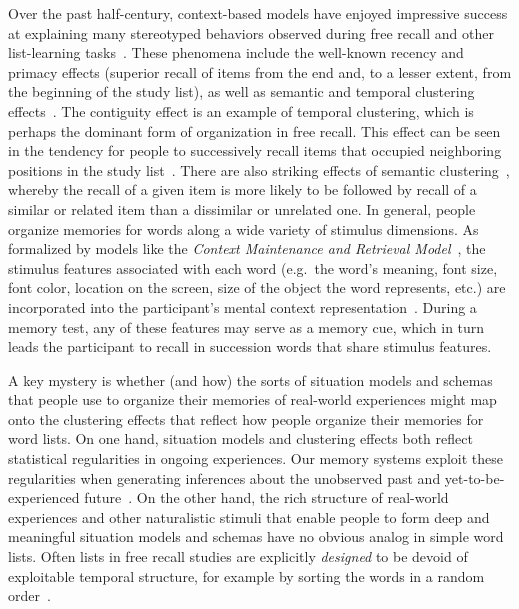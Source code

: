 \documentclass[11pt]{article}
\begin{document}
Over the past half-century, context-based models have enjoyed impressive
success at explaining many stereotyped behaviors observed during free recall
and other list-learning tasks~\citep{Este55a, RaaiShif80, GlenEtal83,
HowaKaha02a, SiroEtal05, KimbEtal07, PolyKaha08, SedeEtal08, PolyEtal09,
ShanHowa12}. These phenomena include the well-known recency and primacy effects
(superior recall of items from the end and, to a lesser extent, from the
beginning of the study list), as well as semantic and temporal clustering
effects~\citep{KahaEtal08b}. The contiguity effect is an example of temporal
clustering, which is perhaps the dominant form of organization in free recall.
This effect can be seen in the tendency for people to successively recall items
that occupied neighboring positions in the study list~\citep{Kaha96}. There are
also striking effects of semantic clustering~\citep{RomnEtal93, Bous53,
BousEtal54, JenkRuss52, MannKaha12}, whereby the recall of a given item is more
likely to be followed by recall of a similar or related item than a dissimilar
or unrelated one. In general, people organize memories for words along a wide
variety of stimulus dimensions. As formalized by models like the \textit{Context
Maintenance and Retrieval Model}~\citep{PolyEtal09}, the stimulus features
associated with each word (e.g.\ the word's meaning, font size, font color,
location on the screen, size of the object the word represents, etc.) are
incorporated into the participant's mental context
representation~\citep{SmitVela01, MannEtal15, Mann20, MannEtal11, MannEtal12}.
During a memory test, any of these features may serve as a memory cue, which in
turn leads the participant to recall in succession words that share stimulus
features.


A key mystery is whether (and how) the sorts of situation models and schemas that people
use to organize their memories of real-world experiences might map onto the
clustering effects that reflect how people organize their memories for word
lists. On one hand, situation models and clustering effects both reflect
statistical regularities in ongoing experiences. Our memory systems exploit
these regularities when generating inferences about the unobserved past and
yet-to-be-experienced future~\citep{XuEtal22, SchaTurk15, RangRitc12,
BoweEtal79, MomeEtal17}. On the other hand, the rich structure of real-world
experiences and other naturalistic stimuli that enable people to form deep and meaningful
situation models and schemas have no obvious analog in simple word lists.  Often lists
in free recall studies are explicitly \textit{designed} to be devoid of exploitable
temporal structure, for example by sorting the words in a random order~\citep{Kaha12}.
\end{document}
